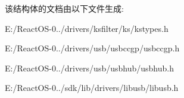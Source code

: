 该结构体的文档由以下文件生成\+:\begin{DoxyCompactItemize}
\item 
E\+:/\+React\+O\+S-\/0../drivers/ksfilter/ks/kstypes.\+h\item 
E\+:/\+React\+O\+S-\/0../drivers/usb/usbccgp/usbccgp.\+h\item 
E\+:/\+React\+O\+S-\/0../drivers/usb/usbhub/usbhub.\+h\item 
E\+:/\+React\+O\+S-\/0../sdk/lib/drivers/libusb/libusb.\+h\end{DoxyCompactItemize}
